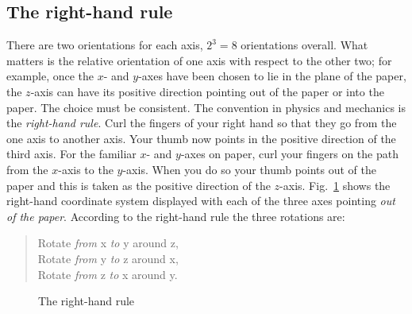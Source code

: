 \subsection{The right-hand rule}

There are two orientations for each axis, $2^3=8$ orientations overall. What matters is the relative orientation of one axis with respect to the other two; for example, once the $x$- and $y$-axes have been chosen to lie in the plane of the paper, the $z$-axis can have its positive direction pointing out of the paper or into the paper. The choice must be consistent. The convention in physics and mechanics is the \emph{right-hand rule}. Curl the fingers of your right hand so that they go from the one axis to another axis. Your thumb now points in the positive direction of the third axis. For the familiar $x$- and $y$-axes on paper, curl your fingers on the path from the $x$-axis to the $y$-axis. When you do so your thumb points out of the paper and this is taken as the positive direction of the $z$-axis. Fig.~\ref{fig.right-hand-rule} shows the right-hand coordinate system displayed with each of the three axes pointing \emph{out of the paper}. According to the right-hand rule the three rotations are:
\begin{quote}
\normalsize
Rotate \emph{from} x \emph{to} y around z,\\
Rotate \emph{from} y \emph{to} z around x,\\
Rotate \emph{from} z \emph{to} x around y.
\end{quote}

\begin{figure}
\begin{center}
\hspace{2em}
\hspace{2em}
\caption{The right-hand rule}\label{fig.right-hand-rule}
\end{center}
\end{figure}

